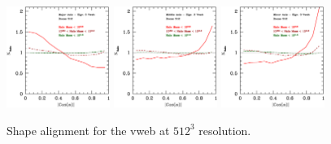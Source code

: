\documentclass[usenatbib]{mn2e}
\begin{document}
\begin{figure}
\includegraphics[width=0.30\textwidth]{../plot2/Ax1_VT/512_AX1_V3.ps}
\includegraphics[width=0.30\textwidth]{../plot2/Ax2_VT/512_AX2_V2.ps}
\includegraphics[width=0.30\textwidth]{../plot2/Ax3_VT/512_AX3_V3.ps}
\caption{Shape alignment for the vweb at $512^3$ resolution.}
\end{figure}
\end{document}

